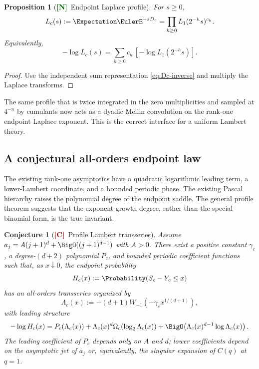 \documentclass[11pt]{article}
\numberwithin{equation}{section}
\newtheorem{proposition}[theorem]{Proposition}
\newtheorem{conjecture}[theorem]{Conjecture}
\theoremstyle{definition}
\theoremstyle{remark}
\newcommand{\New}{\textcolor{darkgreen}{\textsf{\textbf{[N]}}}}
\newcommand{\Conj}{\textcolor{darkred}{\textsf{\textbf{[C]}}}}
\begin{document}
\begin{proposition}[\New\ Endpoint Laplace profile]
\label{prop:Laplace-profile}
For $s\ge0$,
\begin{equation}
 L_c(s):=\Expectation\EulerE^{-sD_c}
 =\prod_{h\ge0}L_1(2^{-h}s)^{c_h}.
 \label{eq:Laplace-profile}
\end{equation}
Equivalently,
\begin{equation}
 -\log L_c(s)=\sum_{h\ge0}c_h\,[-\log L_1(2^{-h}s)].
 \label{eq:Laplace-profile-log}
\end{equation}
\end{proposition}

\begin{proof}
Use the independent sum representation \eqref{eq:Dc-inverse} and multiply the
Laplace transforms.
\end{proof}

The same profile that is twice integrated in the zero multiplicities and
sampled at $4^{-n}$ by cumulants now acts as a dyadic Mellin convolution on
the rank-one endpoint Laplace exponent.  This is the correct interface for a
uniform Lambert theory.

\subsection{A conjectural all-orders endpoint law}

The existing rank-one asymptotics have a quadratic logarithmic leading term,
a lower-Lambert coordinate, and a bounded periodic phase.  The existing Pascal
hierarchy raises the polynomial degree of the endpoint saddle.  The general
profile theorem suggests that the exponent-growth degree, rather than the
special binomial form, is the true invariant.

\begin{conjecture}[\Conj\ Profile Lambert transseries]
\label{conj:Lambert-profile}
Assume
$a_j=A(j+1)^d+\BigO((j+1)^{d-1})$ with $A>0$.  There exist a positive constant
$\gamma_c$, a degree-$(d+2)$ polynomial $P_c$, and bounded periodic coefficient
functions such that, as $x\downarrow0$, the endpoint probability
\begin{equation}
 H_c(x):=\Probability(S_c-Y_c\le x)
\end{equation}
has an all-orders transseries organized by
\begin{equation}
 \Lambda_c(x):=-(d+1)W_{-1}
 \!\left(-\gamma_c x^{1/(d+1)}\right),
 \label{eq:profile-Lambert-coordinate}
\end{equation}
with leading structure
\begin{equation}
 -\log H_c(x)
 =P_c(\Lambda_c(x))
 +\Lambda_c(x)^d
   \Omega_c(\log_2\Lambda_c(x))
 +\BigO\!\left(\Lambda_c(x)^{d-1}\log\Lambda_c(x)\right).
 \label{eq:profile-Lambert-conjecture}
\end{equation}
The leading coefficient of $P_c$ depends only on $A$ and $d$; lower
coefficients depend on the asymptotic jet of $a_j$ or, equivalently, the
singular expansion of $C(q)$ at $q=1$.
\end{conjecture}
\end{document}
